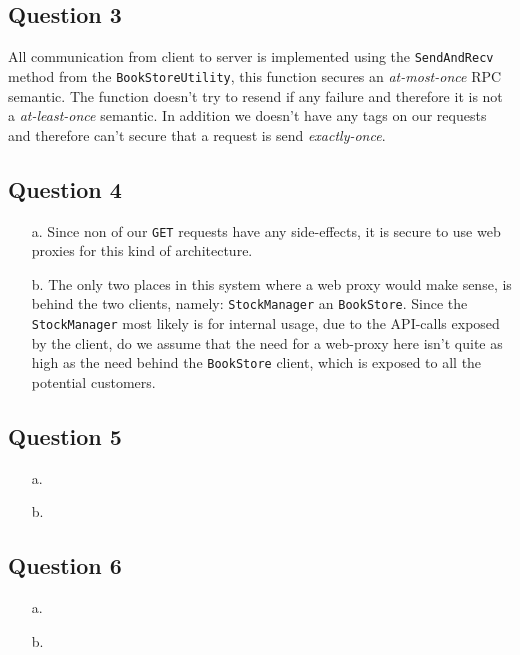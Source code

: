 \documentclass[10pt,a4paper]{article}
\begin{document}
\subsection*{Question 3}
All communication from client to server is implemented using the \texttt{SendAndRecv} method from the \texttt{BookStoreUtility}, this function secures an \textit{at-most-once} RPC semantic. The function doesn't try to resend if any failure and therefore it is not a \textit{at-least-once} semantic. In addition we doesn't have any tags on our requests and therefore can't secure that a request is send \textit{exactly-once}.

\subsection*{Question 4}
\begin{itemize}
	\item[a.] Since non of our \texttt{GET} requests have any side-effects, it is secure to use web proxies for this kind of architecture.
	\item[b.] The only two places in this system where a web proxy would make sense, is behind the two clients, namely: \texttt{StockManager} an \texttt{BookStore}. Since the \texttt{StockManager} most likely is for internal usage, due to the API-calls exposed by the client, do we assume that the need for a web-proxy here isn't quite as high as the need behind the \texttt{BookStore} client, which is exposed to all the potential customers.
\end{itemize}

\subsection*{Question 5}
\begin{itemize}
	\item[a.] 
	\item[b.]
\end{itemize}

\subsection*{Question 6}
\begin{itemize}
	\item[a.] 
	\item[b.]
\end{itemize}
\end{document}
